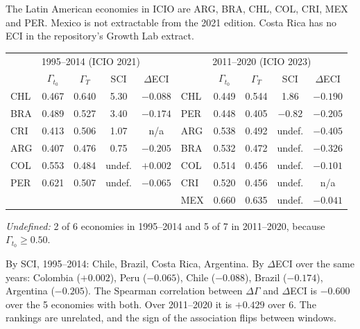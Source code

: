\documentclass[../solutions_manual.tex]{subfiles}
\begin{document}
 The Latin American economies in ICIO are ARG, BRA, CHL, COL, CRI, MEX and PER. Mexico is not extractable from the 2021 edition. Costa Rica has no ECI in the repository's Growth Lab extract.
\begin{center}\small
\begin{tabular}{lcccc|lcccc}
\toprule
\multicolumn{5}{c|}{1995--2014 (ICIO 2021)} & \multicolumn{5}{c}{2011--2020 (ICIO 2023)} \\
& $\Gamma_{t_0}$ & $\Gamma_T$ & SCI & $\Delta$ECI & & $\Gamma_{t_0}$ & $\Gamma_T$ & SCI & $\Delta$ECI \\
\midrule
CHL & 0.467 & 0.640 & 5.30 & $-0.088$ & CHL & 0.449 & 0.544 & 1.86 & $-0.190$ \\
BRA & 0.489 & 0.527 & 3.40 & $-0.174$ & PER & 0.448 & 0.405 & $-0.82$ & $-0.205$ \\
CRI & 0.413 & 0.506 & 1.07 & n/a & ARG & 0.538 & 0.492 & undef. & $-0.405$ \\
ARG & 0.407 & 0.476 & 0.75 & $-0.205$ & BRA & 0.532 & 0.472 & undef. & $-0.326$ \\
COL & 0.553 & 0.484 & undef. & $+0.002$ & COL & 0.514 & 0.456 & undef. & $-0.101$ \\
PER & 0.621 & 0.507 & undef. & $-0.065$ & CRI & 0.520 & 0.456 & undef. & n/a \\
& & & & & MEX & 0.660 & 0.635 & undef. & $-0.041$ \\
\bottomrule
\end{tabular}
\end{center}
\emph{Undefined:} 2 of 6 economies in 1995--2014 and 5 of 7 in 2011--2020, because $\Gamma_{t_0} \ge 0.50$.

 By SCI, 1995--2014: Chile, Brazil, Costa Rica, Argentina. By $\Delta$ECI over the same years: Colombia ($+0.002$), Peru ($-0.065$), Chile ($-0.088$), Brazil ($-0.174$), Argentina ($-0.205$). The Spearman correlation between $\Delta\Gamma$ and $\Delta$ECI is $-0.600$ over the 5 economies with both. Over 2011--2020 it is $+0.429$ over 6. The rankings are unrelated, and the sign of the association flips between windows.
\end{document}
